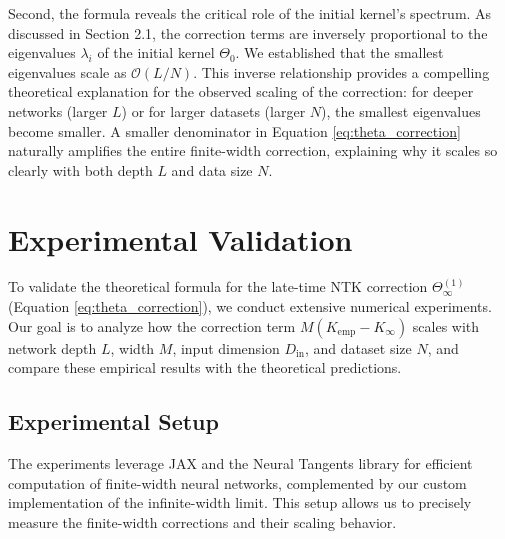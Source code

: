 \documentclass[a4paper]{article}
\begin{document}
Second, the formula reveals the critical role of the initial kernel's spectrum. As discussed in Section 2.1, the correction terms are inversely proportional to the eigenvalues $\lambda_i$ of the initial kernel $\Theta_0$. We established that the smallest eigenvalues scale as $\mathcal{O}(L/N)$. This inverse relationship provides a compelling theoretical explanation for the observed scaling of the correction: for deeper networks (larger $L$) or for larger datasets (larger $N$), the smallest eigenvalues become smaller. A smaller denominator in Equation \ref{eq:theta_correction} naturally amplifies the entire finite-width correction, explaining why it scales so clearly with both depth $L$ and data size $N$.

\section{Experimental Validation}

To validate the theoretical formula for the late-time NTK correction $\Theta^{(1)}_\infty$ (Equation \ref{eq:theta_correction}), we conduct extensive numerical experiments. Our goal is to analyze how the correction term $M(K_{\text{emp}} - K_{\infty})$ scales with network depth $L$, width $M$, input dimension $D_{\text{in}}$, and dataset size $N$, and compare these empirical results with the theoretical predictions.

\subsection{Experimental Setup}

The experiments leverage JAX and the Neural Tangents library for efficient computation of finite-width neural networks, complemented by our custom implementation of the infinite-width limit. This setup allows us to precisely measure the finite-width corrections and their scaling behavior.
\end{document}
